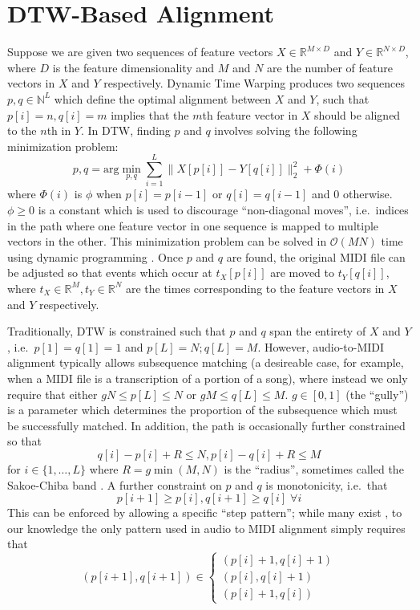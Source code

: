 \documentclass{article}
\begin{document}
\section{DTW-Based Alignment}
\label{sec:dtw}

Suppose we are given two sequences of feature vectors $X \in \mathbb{R}^{M \times D}$ and $Y \in \mathbb{R}^{N \times D}$, where $D$ is the feature dimensionality and $M$ and $N$ are the number of feature vectors in $X$ and $Y$ respectively.
Dynamic Time Warping produces two sequences $p, q \in \mathbb{N}^L$ which define the optimal alignment between $X$ and $Y$, such that $p[i] = n, q[i] = m$ implies that the $m$th feature vector in $X$ should be aligned to the $n$th in $Y$.
In DTW, finding $p$ and $q$ involves solving the following minimization problem:
$$
p, q = \mathrm{arg}\min_{p, q} \sum_{i = 1}^{L} \|X[p[i]] - Y[q[i]]\|_2^2 + \Phi(i)
$$
where $\Phi(i)$ is $\phi$ when $p[i] = p[i - 1]$ or $q[i] = q[i - 1]$ and $0$ otherwise.
$\phi \ge 0$ is a constant which is used to discourage ``non-diagonal moves'', i.e.\ indices in the path where one feature vector in one sequence is mapped to multiple vectors in the other.
This minimization problem can be solved in $\mathcal{O}(MN)$ time using dynamic programming \cite{sakoe1978dynamic}.
Once $p$ and $q$ are found, the original MIDI file can be adjusted so that events which occur at $t_X[p[i]]$ are moved to $t_Y[q[i]]$, where $t_X \in \mathbb{R}^M, t_Y \in \mathbb{R}^N$ are the times corresponding to the feature vectors in $X$ and $Y$ respectively.

Traditionally, DTW is constrained such that $p$ and $q$ span the entirety of $X$ and $Y$, i.e.\ $p[1] = q[1] = 1$ and $p[L] = N; q[L] = M$.
However, audio-to-MIDI alignment typically allows subsequence matching (a desireable case, for example, when a MIDI file is a transcription of a portion of a song), where instead we only require that either $gN \le p[L] \le N$ or $gM \le q[L] \le M$.
$g \in [0, 1]$ (the ``gully'') is a parameter which determines the proportion of the subsequence which must be successfully matched.
In addition, the path is occasionally further constrained so that
\begin{equation}
q[i] - p[i] + R \le N, p[i] - q[i] + R \le M
\end{equation}
for $i \in \{1, \ldots, L\}$ where $R = g\min(M, N)$ is the ``radius'', sometimes called the Sakoe-Chiba band \cite{sakoe1978dynamic}.
A further constraint on $p$ and $q$ is monotonicity, i.e.\ that
$$
p[i + 1] \ge p[i], q[i + 1] \ge q[i] \; \forall i
$$
This can be enforced by allowing a specific ``step pattern''; while many exist \cite{muller2007dynamic, sakoe1978dynamic}, to our knowledge the only pattern used in audio to MIDI alignment simply requires that
$$
(p[i + 1], q[i + 1]) \in \begin{cases}
(p[i] + 1, q[i] + 1)\\
(p[i], q[i] + 1)\\
(p[i] + 1, q[i])
\end{cases}
$$
\end{document}
